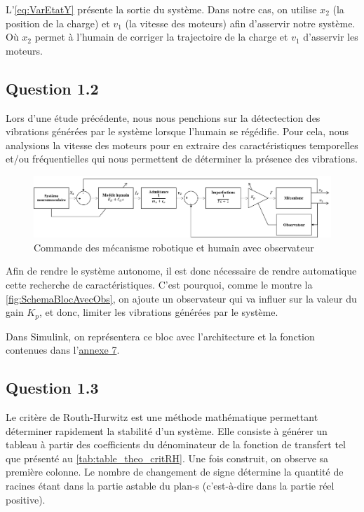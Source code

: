 \documentclass[a4paper,12pt]{article}
\begin{document}
    L'\autoref{eq:VarEtatY} présente la sortie du système. Dans notre cas, on utilise $x_2$ (la position de la charge) et $v_1$ (la vitesse des moteurs) afin d'asservir notre système. Où $x_2$ permet à l'humain de corriger la trajectoire de la charge et $v_1$ d'asservir les moteurs.
    
    
    \subsection{Question 1.2}
    Lors d'une étude précédente, nous nous penchions sur la détectection des vibrations générées par le système lorsque l'humain se régédifie. Pour cela, nous analysions la vitesse des moteurs pour en extraire des caractéristiques temporelles et/ou fréquentielles qui nous permettent de déterminer la présence des vibrations. \\
    
    \begin{figure}[H]
        \centering
        \includegraphics[width=16cm]{./img/SchemaBlocAvecObs.png}
        \caption{Commande des mécanisme robotique et humain avec observateur\label{fig:SchemaBlocAvecObs}}
    \end{figure}
    
    Afin de rendre le système autonome, il est donc nécessaire de rendre automatique cette recherche de caractéristiques. C'est pourquoi, comme le montre la \autoref{fig:SchemaBlocAvecObs}, on ajoute un observateur qui va influer sur la valeur du gain $K_p$, et donc, limiter les vibrations générées par le système.
    
    Dans Simulink, on représentera ce bloc avec l'architecture et la fonction contenues dans l'\hyperref[Annexe:modelObs]{annexe 7}.
    
    
    \subsection{Question 1.3}
    Le critère de Routh-Hurwitz est une méthode mathématique permettant déterminer rapidement la stabilité d'un système. Elle consiste à générer un tableau à partir des coefficients du dénominateur de la fonction de transfert tel que présenté au \autoref{tab:table_theo_critRH}. Une fois construit, on observe sa première colonne. Le nombre de changement de signe détermine la quantité de racines étant dans la partie astable du plan-s (c'est-à-dire dans la partie réel positive).
    
\end{document}
